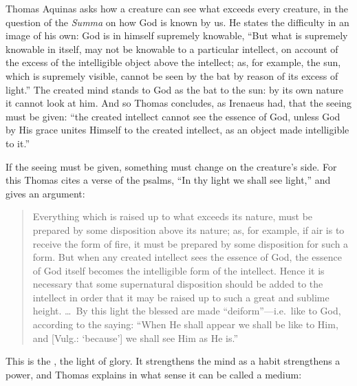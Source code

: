 Thomas Aquinas asks how a creature can see what exceeds every creature, in the question of the \emph{Summa} on how God is known by us. He states the difficulty in an image of his own: God is in himself supremely knowable, ``But what is supremely knowable in itself, may not be knowable to a particular intellect, on account of the excess of the intelligible object above the intellect; as, for example, the sun, which is supremely visible, cannot be seen by the bat by reason of its excess of light.'' The created mind stands to God as the bat to the sun: by its own nature it cannot look at him. And so Thomas concludes, as Irenaeus had, that the seeing must be given: ``the created intellect cannot see the essence of God, unless God by His grace unites Himself to the created intellect, as an object made intelligible to it.''

If the seeing must be given, something must change on the creature's side. For this Thomas cites a verse of the psalms, ``In thy light we shall see light,'' and gives an argument:

\begin{quote}
Everything which is raised up to what exceeds its nature, must be prepared by some disposition above its nature; as, for example, if air is to receive the form of fire, it must be prepared by some disposition for such a form. But when any created intellect sees the essence of God, the essence of God itself becomes the intelligible form of the intellect. Hence it is necessary that some supernatural disposition should be added to the intellect in order that it may be raised up to such a great and sublime height. \ldots\ By this light the blessed are made ``deiform''---i.e.\ like to God, according to the saying: ``When He shall appear we shall be like to Him, and [Vulg.: `because'] we shall see Him as He is.''
\end{quote}

This is the , the light of glory. It strengthens the mind as a habit strengthens a power, and Thomas explains in what sense it can be called a medium:

